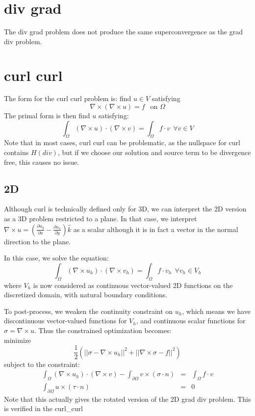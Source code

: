 \documentclass{article}
\newcommand{\pp}[2]{\frac{\partial #1}{\partial #2}}
\begin{document}
\section{div grad}
The div grad problem does not produce the same superconvergence as 
the grad div problem. 

\section{curl curl}
The form for the curl curl problem is: find $u\in V$ satisfying 
$$\nabla\times(\nabla\times u) = f~~\text{ on }\Omega$$
The primal form is then find $u$ satisfying: 
$$\int_\Omega(\nabla\times u)\cdot(\nabla\times v)=\int_\Omega f\cdot v
~~\forall v\in V$$
Note that in most cases, curl curl can be problematic, as the nullspace 
for curl contains $H(div)$, but if we choose our solution and source 
term to be divergence free, this causes no issue. 

\subsection{2D}
Although curl is technically defined only for 3D, we can interpret 
the 2D version as a 3D problem restricted to a plane. In that case, 
we interpret $\nabla\times u=\left(\pp{u_y}{x}-\pp{u_x}{y}\right)\hat{k}$ 
as a scalar although it is in fact a vector in the normal direction to the 
plane. 

In this case, we solve the equation: 
$$\int_\Omega(\nabla\times u_h)\cdot(\nabla\times v_h)=
\int_\Omega f\cdot v_h~~\forall v_h\in V_h$$ where $V_h$ is now 
considered as continuous vector-valued 2D functions on the discretized 
domain, with natural boundary conditions. 

To post-process, we weaken the continuity constraint on $u_h$, 
which means we have discontinuous vector-valued functions 
for $V_h$, and continuous scalar functions for $\sigma=\nabla\times u$. 
Thus the constrained optimization becomes: \\
minimize $$\frac{1}{2}\left(||\sigma-\nabla\times u_h||^2
+||\nabla\times\sigma-f||^2\right)$$
subject to the constraint: 
$$\begin{array}{rcl}
\int_\Omega(\nabla\times u_h)\cdot(\nabla\times v) - 
\int_{\partial\Omega}v\times(\sigma\cdot n)&=&\int_\Omega f\cdot v\\
\int_{\partial\Omega}u\times(\tau\cdot n)&=&0
\end{array}$$
Note that this actually gives the rotated version of the 2D 
grad div problem. This is verified in the curl\_curl
\end{document}
